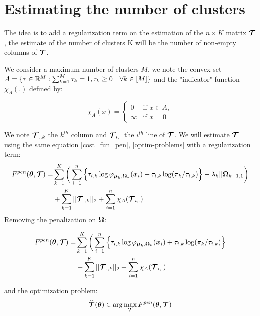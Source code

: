 
\chapter{Estimating the number of clusters}

The idea is to add a regularization term on the estimation of the $n\times K$ matrix $\boldsymbol{\mathcal T}$, the estimate of the number of clusters K will be the number of non-empty columns of $\boldsymbol{\mathcal T}$.\

We consider a maximum number of clusters $M$, we note the convex set $A=\{\tau \in {\mathbb R}^M : \sum_{k=1}^M\tau_k=1, \tau_k\geq 0 \quad \forall k \in [M] \}$ and the "indicator" function $\chi_A(.)$ defined by:


  \begin{equation*}
    \chi_A(x) =
    \begin{cases}
      0 & \text{if } x \in A,\\
      	\infty & \text{if } x = 0
    \end{cases}
\end{equation*}

We note $\boldsymbol{\mathcal T}_{.,k}$ the $k^{th}$ column and $\boldsymbol{\mathcal T}_{i,.}$ the $i^{th}$ line of $\boldsymbol{\mathcal T}$. We will estimate $\boldsymbol{\mathcal T}$ using the same equation \ref{cost_fun_pen}, \ref{optim-problems} with a regularization term:\\
\begin{align*}
F^{pen}({\boldsymbol\theta},\boldsymbol{\mathcal T})  =& \sum_{k=1}^K \bigg(\sum_{i=1}^{n} \Big\{\tau_{i,k}\log\varphi_{\boldsymbol\mu_{k},\boldsymbol\Omega_{k}}(\boldsymbol x_i)+\tau_{i,k}
    \log(\pi_k/\tau_{i,k})\Big\}-\lambda_k||\boldsymbol\Omega_k||_{1,1}\bigg)\\ 
    &+ \sum_{k=1}^K ||\boldsymbol{\mathcal T}_{.,k}||_{2} + \sum_{i=1}^{n} \chi_A(\boldsymbol{\mathcal T}_{i,.})
\end{align*}
Removing the penalization on $\boldsymbol\Omega$:

\begin{align*}
F^{pen}({\boldsymbol\theta},\boldsymbol{\mathcal T})  =& \sum_{k=1}^K \bigg(\sum_{i=1}^{n} \Big\{\tau_{i,k}\log\varphi_{\boldsymbol\mu_{k},\boldsymbol\Omega_{k}}(\boldsymbol x_i)+\tau_{i,k}
    \log(\pi_k/\tau_{i,k})\Big\}\\ 
    &+ \sum_{k=1}^K ||\boldsymbol{\mathcal T}_{.,k}||_{2} + \sum_{i=1}^{n} \chi_A(\boldsymbol{\mathcal T}_{i,.})
\end{align*}

 and the optimization problem:
\begin{equation}
\widehat{\boldsymbol{\mathcal T}}({\boldsymbol\theta})\in \arg\max_{\boldsymbol{\mathcal T}} F^{pen}({\boldsymbol\theta},\boldsymbol{\mathcal T})
\end{equation}

